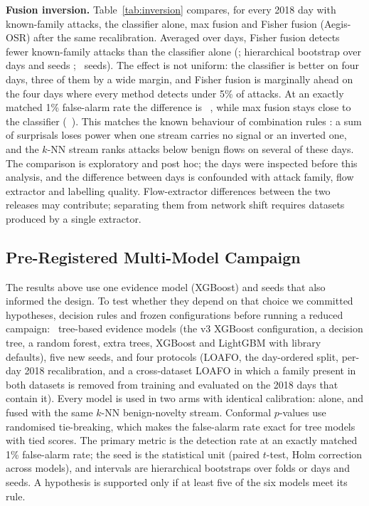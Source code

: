 \documentclass[conference]{IEEEtran}
\begin{document}
\textbf{Fusion inversion.} Table~\ref{tab:inversion} compares, for every 2018 day with known-family attacks, the classifier alone, max fusion and Fisher fusion (Aegis-OSR) after the same recalibration. Averaged over days, Fisher fusion detects fewer known-family attacks than the classifier alone (\FactRaPdFisherXgbConf; hierarchical bootstrap over days and seeds \FactRaPdFisherXgbConfCi; \FactRaPdFisherXgbConfSeeds\ seeds). The effect is not uniform: the classifier is better on four days, three of them by a wide margin, and Fisher fusion is marginally ahead on the four days where every method detects under 5\% of attacks. At an exactly matched 1\% false-alarm rate the difference is \FactRaPdFisherXgbMatched\ \FactRaPdFisherXgbMatchedCi, while max fusion stays close to the classifier (\FactRaPdMaxXgbMatched\ \FactRaPdMaxXgbMatchedCi). This matches the known behaviour of combination rules \cite{birnbaum1954combining,heard2018choosing}: a sum of surprisals loses power when one stream carries no signal or an inverted one, and the $k$-NN stream ranks attacks below benign flows on several of these days. The comparison is exploratory and post hoc; the days were inspected before this analysis, and the difference between days is confounded with attack family, flow extractor and labelling quality. Flow-extractor differences between the two releases may contribute; separating them from network shift requires datasets produced by a single extractor.






\subsection{Pre-Registered Multi-Model Campaign}\label{sec:r3}
The results above use one evidence model (XGBoost) and seeds that also informed the design. To test whether they depend on that choice we committed hypotheses, decision rules and frozen configurations before running a reduced campaign: \FactRThreeModels\ tree-based evidence models (the v3 XGBoost configuration, a decision tree, a random forest, extra trees, XGBoost and LightGBM with library defaults), five new seeds, and four protocols (LOAFO, the day-ordered split, per-day 2018 recalibration, and a cross-dataset LOAFO in which a family present in both datasets is removed from training and evaluated on the 2018 days that contain it). Every model is used in two arms with identical calibration: alone, and fused with the same $k$-NN benign-novelty stream. Conformal $p$-values use randomised tie-breaking, which makes the false-alarm rate exact for tree models with tied scores. The primary metric is the detection rate at an exactly matched 1\% false-alarm rate; the seed is the statistical unit (paired $t$-test, Holm correction across models), and intervals are hierarchical bootstraps over folds or days and seeds. A hypothesis is supported only if at least five of the six models meet its rule.
\end{document}
